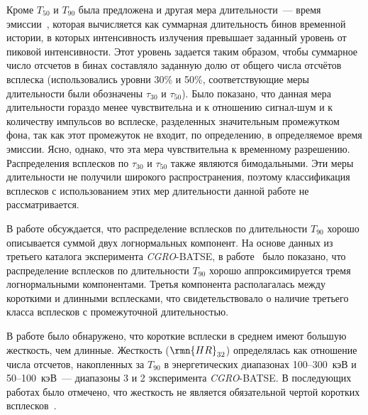 Кроме $T_{50}$ и $T_{90}$ была предложена и другая мера длительности~--- время 
эмиссии~\citep{Mitrofanov_1999}, которая вычисляется как суммарная длительность 
бинов временной истории, в которых интенсивность излучения превышает заданный 
уровень от пиковой интенсивности. Этот уровень задается таким образом, чтобы 
суммарное число отсчетов в бинах составляло заданную долю от общего числа отсчётов 
всплеска (использовались уровни 30\% и 50\%, соответствующие меры длительности 
были обозначены $\tau_{30}$ и $\tau_{50}$). Было показано, что данная мера 
длительности гораздо менее чувствительна и к отношению сигнал-шум и к количеству 
импульсов во всплеске, разделенных значительным промежутком фона, так как этот 
промежуток не входит, по определению, в определяемое время эмиссии. Ясно, однако, 
что эта мера чувствительна к временному разрешению. Распределения всплесков 
по $\tau_{30}$ и $\tau_{50}$  также являются бимодальными. Эти меры длительности 
не получили широкого распространения, поэтому классификация всплесков 
с использованием этих мер длительности данной работе не рассматривается. 

В работе \citep{McBreen_1994} обсуждается, что распределение всплесков по 
длительности $T_{90}$ хорошо описывается суммой двух логнормальных компонент. 
На основе данных из третьего каталога эксперимента \textit{CGRO}-BATSE, 
в работе~\citep{Horvath_2002} было показано, что распределение всплесков 
по длительности $T_{90}$ хорошо аппроксимируется тремя логнормальными компонентами. 
Третья компонента располагалась между короткими и длинными всплесками, 
что свидетельствовало о наличие третьего класса всплесков с промежуточной длительностью.

В работе \citep{Kouveliotou_1993} было обнаружено, что короткие всплески в 
среднем имеют большую жесткость, чем длинные. Жесткость ($\rmn{HR}_{32}$) определялась 
как отношение числа отсчетов, накопленных за $T_{90}$ в энергетических 
диапазонах 100--300~кэВ и 50--100~кэВ~--- диапазоны 3 и 2 эксперимента \textit{CGRO}-BATSE. 
В последующих работах было отмечено, что жесткость не является обязательной чертой 
коротких всплесков~\citep[см. например][]{Sakamoto_2006_proc, Norris_and_Bonnel_2006}. 

